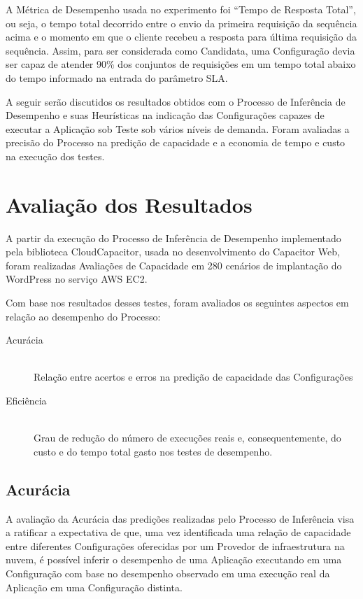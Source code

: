 A Métrica de Desempenho usada no experimento foi ``Tempo de Resposta Total'', ou 
seja, o tempo total decorrido entre o envio da primeira requisição da sequência 
acima e o momento em que o cliente recebeu a resposta para última requisição da
sequência. Assim, para ser considerada como Candidata, uma Configuração devia 
ser capaz de atender 90\% dos conjuntos de requisições em um tempo total abaixo 
do tempo informado na entrada do parâmetro SLA.

A seguir serão discutidos os resultados obtidos com o Processo de Inferência de 
Desempenho e suas Heurísticas na indicação das Configurações capazes de executar
a Aplicação sob Teste sob vários níveis de demanda. Foram avaliadas a precisão do 
Processo na predição de capacidade e a economia de tempo e custo na execução
dos testes.

\section{Avaliação dos Resultados}
\label{sec:resultados_avaliacao}
A partir da execução do Processo de Inferência de Desempenho implementado pela
biblioteca CloudCapacitor, usada no desenvolvimento do Capacitor Web, foram 
realizadas Avaliações de Capacidade em 280 cenários de implantação do WordPress 
no serviço AWS EC2.

Com base nos resultados desses testes, foram avaliados os seguintes aspectos em
relação ao desempenho do Processo: 

\begin{description}
  \item[Acurácia] \hfill \\ Relação entre acertos e erros na predição de 
  capacidade das Configurações    
  \item[Eficiência] \hfill \\ Grau de redução do número de execuções reais e,
  consequentemente, do custo e do tempo total gasto nos testes de desempenho.
\end{description}

\subsection{Acurácia}
\label{subsec:resultados_precisao}
A avaliação da Acurácia das predições realizadas pelo Processo de Inferência visa 
a ratificar a expectativa de que, uma vez identificada uma relação de capacidade 
entre diferentes Configurações oferecidas por um Provedor de infraestrutura na 
nuvem, é possível inferir o desempenho de uma Aplicação executando em uma 
Configuração com base no desempenho observado em uma execução real da Aplicação 
em uma Configuração distinta.


